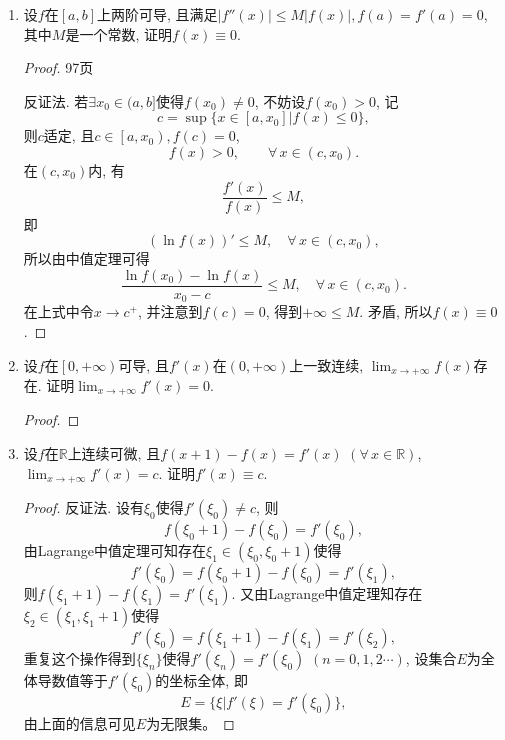 \begin{2a}
\begin{enumerate}
\begin{enumerate}[label=(\arabic*)]
\begin{proof}[解答]
\[\begin{aligned}
\end{aligned}\]
\end{proof}
\item \(\lim_{x\rightarrow 0}\frac{\left(1+\frac{x}{x+1}\right)^{(1+x)/x}-\left(1+\tan x\right)^{1/\tan x}}{x^2}\).
\begin{proof}[解答]
设\(F(x)=\left(1+x\right)^{1/x}\), 注意到
\[\lim_{x\rightarrow 0}\frac{\frac{x}{x+1}-\tan x}{x^2}
=\lim_{x\rightarrow0}\frac{x-(x+1)\tan x}{x^2}\xlongequal{\text{L'H\^{o}pital}}-1,\]
以及\[\lim_{x\rightarrow 0}F'(x)=\ee\lim_{x\rightarrow 0}\frac{x-(1+x)\ln(1+x)}{x^2}\xlongequal{\text{L'H\^{o}pital}}-\frac{\ee}{2}.\]
于是\[\begin{aligned}
&\quad\lim_{x\rightarrow 0}\frac{\left(1+\frac{x}{x+1}\right)^{(1+x)/x}-\left(1+\tan x\right)^{1/\tan x}}{x^2}\\
&=\lim_{x\rightarrow 0}\frac{\left(1+\frac{x}{x+1}\right)^{(1+x)/x}-\left(1+\tan x\right)^{1/\tan x}}{\frac{x}{x+1}-\tan x}\cdot\frac{\frac{x}{x+1}-\tan x}{x^2}=\frac{\ee}{2}.
\end{aligned}\]
\end{proof}
\end{enumerate}
\item 设\(f\)在\([a,b]\)上两阶可导, 且满足\(|f''(x)|\leqslant M|f(x)|,f(a)=f'(a)=0\), 其中\(M\)是一个常数, 证明\(f(x)\equiv 0\).
\begin{proof}
97页

反证法. 若\(\exists x_0\in(a,b]\)使得\(f(x_0)\ne 0\), 不妨设\(f(x_0)>0\), 记
\[c=\sup\{x\in[a,x_0]\big|f(x)\leqslant 0\},\]
则\(c\)适定, 且\(c\in\left[a,x_0\right),f(c)=0\),
\[f(x)>0,\qquad\forall\, x\in(c,x_0).\]
在\((c,x_0)\)内, 有\[\frac{f'(x)}{f(x)}\leqslant M,\]
即\[\left(\ln f(x)\right)'\leqslant M,\quad\forall\, x\in(c,x_0),\]
所以由中值定理可得\[\frac{\ln f(x_0)-\ln f(x)}{x_0-c}\leqslant M,\quad\forall\, x\in(c,x_0).\]
在上式中令\(x\rightarrow c^+\), 并注意到\(f(c)=0\), 
得到\(+\infty\leqslant M\). 矛盾, 所以\(f(x)\equiv 0\).
\end{proof}
\item 设\(f\)在\(\left[0,+\infty\right)\)可导, 
且\(f'(x)\)在\(\left(0,+\infty\right)\)上一致连续, 
\(\lim_{x\rightarrow+\infty}f(x)\)存在. 
证明\(\lim_{x\rightarrow+\infty}f'(x)=0\).
\begin{proof}

\end{proof}
\item 设\(f\)在\(\mathbb{R}\)上连续可微, 
且\(f(x+1)-f(x)=f'(x)\) \((\forall\, x\in\mathbb{R})\), 
\(\lim_{x\rightarrow+\infty}f'(x)=c\). 证明\(f'(x)\equiv c\).
\begin{proof}
反证法. 设有\(\xi_0\)使得\(f'(\xi_0)\ne c\), 则
\[f(\xi_0+1)-f(\xi_0)=f'(\xi_0),\] 
由Lagrange中值定理可知存在\(\xi_1\in(\xi_0,\xi_0+1)\)使得
\[f'(\xi_0)=f(\xi_0+1)-f(\xi_0)=f'(\xi_1),\] 
则\(f(\xi_1+1)-f(\xi_1)=f'(\xi_1)\). 
又由Lagrange中值定理知存在\(\xi_2\in(\xi_1,\xi_1+1)\)使得
\[f'(\xi_0)=f(\xi_1+1)-f(\xi_1)=f'(\xi_2),\]
重复这个操作得到\(\{\xi_n\}\)使得\(f'(\xi_n)=f'(\xi_0)\) \((n=0,1,2\cdots)\), 
设集合\(E\)为全体导数值等于\(f'(\xi_0)\)的坐标全体, 即
\[E=\{\xi\big|f'(\xi)=f'(\xi_0)\},\]由上面的信息可见\(E\)为无限集。


\end{proof}
\end{enumerate}
\end{2a}
